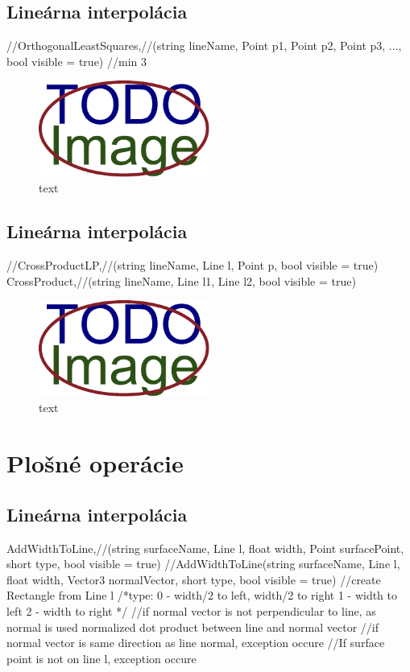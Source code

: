 \subsection{Lineárna interpolácia}
		//OrthogonalLeastSquares,//(string lineName, Point p1, Point p2, Point p3, ..., bool visible = true) //min 3

\begin{figure}[H]
	\centering
	\includegraphics[width=0.5\textwidth]{obrazky-figures/placeholder.pdf}
	\caption{text}
	\label{fig:1}
\end{figure}


\subsection{Lineárna interpolácia}
		//CrossProductLP,//(string lineName, Line l, Point p, bool visible = true)
		CrossProduct,//(string lineName, Line l1, Line l2, bool visible = true)

\begin{figure}[H]
	\centering
	\includegraphics[width=0.5\textwidth]{obrazky-figures/placeholder.pdf}
	\caption{text}
	\label{fig:1}
\end{figure}





\section{Plošné operácie}


\subsection{Lineárna interpolácia}
	AddWidthToLine,//(string surfaceName, Line l, float width, Point surfacePoint, short type, bool visible = true)
	//AddWidthToLine(string surfaceName, Line l, float width, Vector3 normalVector, short type, bool visible = true)
//create Rectangle from Line l
/*type:
	0 - width/2 to left, width/2 to right
	1 - width to left
	2 - width to right
	*/
	//if normal vector is not perpendicular to line, as normal is used normalized dot product between line and normal vector
	//if normal vector is same direction as line normal, exception occure
	//If surface point is not on line l, exception occure

